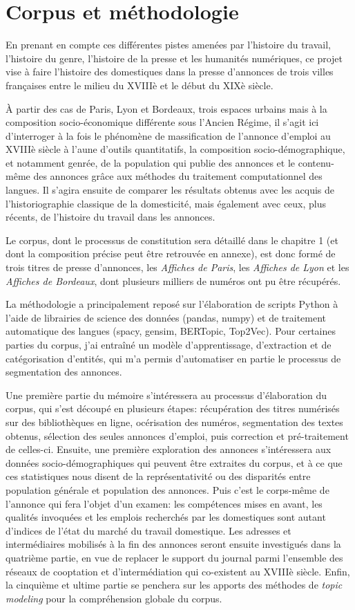 \section{Corpus et méthodologie}


En prenant en compte ces différentes pistes amenées par l'histoire du travail, l'histoire du genre, l'histoire de la presse et les humanités numériques, ce projet vise à faire l'histoire des domestiques dans la presse d'annonces de trois villes françaises entre le milieu du XVIIIè et le début du XIXè siècle.  

À partir des cas de Paris, Lyon et Bordeaux, trois espaces urbains mais à la composition socio-économique différente sous l'Ancien Régime, il s'agit ici d'interroger à la fois le phénomène de massification de l'annonce d'emploi au XVIIIè siècle à l'aune d'outils quantitatifs, la composition socio-démographique, et notamment genrée, de la population qui publie des annonces et le contenu-même des annonces grâce aux méthodes du traitement computationnel des langues. Il s'agira ensuite de comparer les résultats obtenus avec les acquis de l'historiographie classique de la domesticité, mais également avec ceux, plus récents, de l'histoire du travail dans les annonces. 

Le corpus, dont le processus de constitution sera détaillé dans le chapitre 1 (et dont la composition précise peut être retrouvée en annexe), est donc formé de trois titres de presse d'annonces, les \textit{Affiches de Paris}, les \textit{Affiches de Lyon} et les \textit{Affiches de Bordeaux}, dont plusieurs milliers de numéros ont pu être récupérés.

La méthodologie a principalement reposé sur l'élaboration de scripts Python à l'aide de librairies de science des données (pandas, numpy) et de traitement automatique des langues (spacy, gensim, BERTopic, Top2Vec). Pour certaines parties du corpus, j'ai entraîné un modèle d'apprentissage, d'extraction et de catégorisation d'entités, qui m'a permis d'automatiser en partie le processus de segmentation des annonces.

Une première partie du mémoire s'intéressera au processus d'élaboration du corpus, qui s'est découpé en plusieurs étapes: récupération des titres numérisés sur des bibliothèques en ligne, océrisation des numéros, segmentation des textes obtenus, sélection des seules annonces d'emploi, puis correction et pré-traitement de celles-ci. Ensuite, une première exploration des annonces s'intéressera aux données socio-démographiques qui peuvent être extraites du corpus, et à ce que ces statistiques nous disent de la représentativité ou des disparités entre population générale et population des annonces. Puis c'est le corps-même de l'annonce qui fera l'objet d'un examen: les compétences mises en avant, les qualités invoquées et les emplois recherchés par les domestiques sont autant d'indices de l'état du marché du travail domestique. Les adresses et intermédiaires mobilisés à la fin des annonces seront ensuite investigués dans la quatrième partie, en vue de replacer le support du journal parmi l'ensemble des réseaux de cooptation et d'intermédiation qui co-existent au XVIIIè siècle. Enfin, la cinquième et ultime partie se penchera sur les apports des méthodes de \textit{topic modeling} pour la compréhension globale du corpus.
